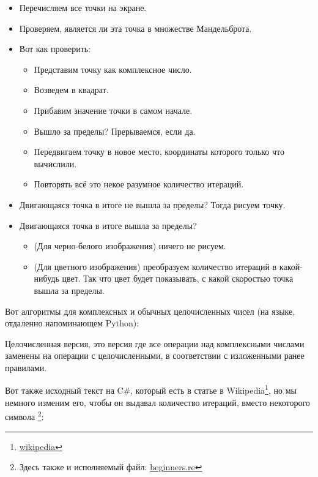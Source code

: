 \begin{itemize}
\item Перечисляем все точки на экране. 
\item Проверяем, является ли эта точка в множестве Мандельброта.
\item Вот как проверить:

  \begin{itemize}
  \item Представим точку как комплексное число.
  \item Возведем в квадрат.
  \item Прибавим значение точки в самом начале.
  \item Вышло за пределы? Прерываемся, если да.
  \item Передвигаем точку в новое место, координаты которого только что вычислили.
  \item Повторять всё это некое разумное количество итераций.
  \end{itemize}

\item Двигающаяся точка в итоге не вышла за пределы?
Тогда рисуем точку.

\item Двигающаяся точка в итоге вышла за пределы?

  \begin{itemize}
    \item (Для черно-белого изображения) ничего не рисуем.
    \item 
(Для цветного изображения) преобразуем количество итераций в какой-нибудь цвет.
Так что цвет будет показывать, с какой скоростью точка вышла за пределы.

  \end{itemize}

\end{itemize}

Вот алгоритмы для комплексных и обычных целочисленных чисел (на языке, отдаленно напоминающем Python):%




Целочисленная версия, это версия где все операции над комплексными числами заменены на операции 
с целочисленными, в соответствии с изложенными ранее правилами.




Вот также исходный текст на C\#, который есть в статье в Wikipedia\footnote{\href{http://go.yurichev.com/17307}{wikipedia}}, но мы немного изменим его,
чтобы он выдавал количество итераций, вместо некоторого символа
\footnote{Здесь также и исполняемый файл: 
\href{http://go.yurichev.com/17163}{beginners.re}}:

